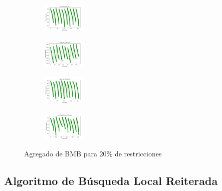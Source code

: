 \begin{figure}[H]
\begin{subfigure}
        \centering
        \includegraphics[width=0.234\textwidth]{img/bmb/iris_set_const_20_3773969821_cost.png}
    \end{subfigure}
    \hfill
    \begin{subfigure}
        \centering
        \includegraphics[width=0.234\textwidth]{img/bmb/ecoli_set_const_20_3773969821_cost.png}
    \end{subfigure}
    \hfill
    \begin{subfigure}
        \centering
        \includegraphics[width=0.234\textwidth]{img/bmb/rand_set_const_20_3773969821_cost.png}
    \end{subfigure}
    \hfill
    \begin{subfigure}
        \centering
        \includegraphics[width=0.234\textwidth]{img/bmb/newthyroid_set_const_20_3773969821_cost.png}
    \end{subfigure}
    \caption{Agregado de BMB para 20\% de restricciones}
\end{figure}

\vspace*{\fill}
\newpage


\subsection{Algoritmo de Búsqueda Local Reiterada}

